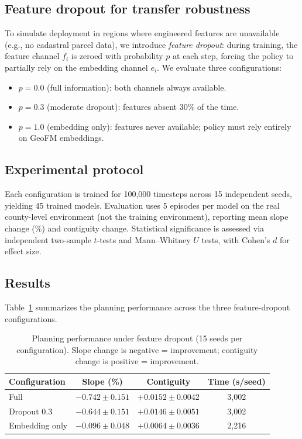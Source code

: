 \documentclass{article}
\begin{document}
\subsection{Feature dropout for transfer robustness}

To simulate deployment in regions where engineered features are unavailable (e.g., no cadastral parcel data), we introduce \textit{feature dropout}: during training, the feature channel $f_i$ is zeroed with probability $p$ at each step, forcing the policy to partially rely on the embedding channel $e_i$. We evaluate three configurations:
\begin{itemize}
\item $p = 0.0$ (full information): both channels always available.
\item $p = 0.3$ (moderate dropout): features absent 30\% of the time.
\item $p = 1.0$ (embedding only): features never available; policy must rely entirely on GeoFM embeddings.
\end{itemize}

\subsection{Experimental protocol}

Each configuration is trained for 100{,}000 timesteps across 15 independent seeds, yielding 45 trained models. Evaluation uses 5 episodes per model on the real county-level environment (not the training environment), reporting mean slope change (\%) and contiguity change. Statistical significance is assessed via independent two-sample $t$-tests and Mann--Whitney $U$ tests, with Cohen's $d$ for effect size.

\subsection{Results}

Table~\ref{tab:dropout} summarizes the planning performance across the three feature-dropout configurations.

\begin{table}[htbp]
\centering
\caption{Planning performance under feature dropout (15 seeds per configuration). Slope change is negative = improvement; contiguity change is positive = improvement.}
\label{tab:dropout}
\footnotesize
\begin{tabular*}{\textwidth}{@{\extracolsep{\fill}}lccc@{}}
\toprule
Configuration & Slope (\%) & Contiguity & Time (s/seed) \\
\midrule
Full & $-0.742 \pm 0.151$ & $+0.0152 \pm 0.0042$ & 3{,}002 \\
Dropout 0.3 & $-0.644 \pm 0.151$ & $+0.0146 \pm 0.0051$ & 3{,}002 \\
Embedding only & $-0.096 \pm 0.048$ & $+0.0064 \pm 0.0036$ & 2{,}216 \\
\bottomrule
\end{tabular*}
\end{table}
\end{document}

